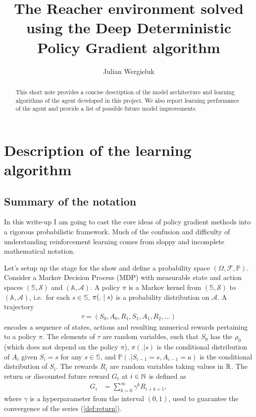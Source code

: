\documentclass[a4paper,12pt]{amsart}
\title[Deep Deterministic Policy Gradients]{The Reacher environment solved using the Deep Deterministic Policy Gradient algorithm}
\author{Julian Wergieluk}\address{}\email{julian.wergieluk@risklab.com}
\newcommand{\stateSpace}{\mathbb S}
\newcommand{\stateSpaceAlg}{\mathcal S}
\newcommand{\actionSpace}{\mathbb A}
\newcommand{\actionSpaceAlg}{\mathcal A}
\newcommand{\policy}{\pi}
\newcommand{\discountFactor}{\gamma}
\newcommand{\prob}{\mathbb P}
\newcommand{\trajectory}{\tau}
\newcommand{\startStateDist}{\rho_0}
\begin{document}
\maketitle

\begin{abstract}
This short note provides a concise description of the model architecture and
learning algorithms of the agent developed in this project. We also report learning
performance of the agent and provide a list of possible future model improvements.
\end{abstract}

\section{Description of the learning algorithm}


\subsection{Summary of the notation}

In this write-up I am going to cast the core ideas of policy gradient methods
into a rigorous probabilistic framework. Much of the confusion and
difficulty of understanding reinforcement learning comes from sloppy and
incomplete mathematical notation.

Let's setup up the stage for the show and define a probability space
$\left( \Omega, \mathcal F, \prob \right)$.
Consider a Markov Decision Process (MDP) with measurable state and action spaces
$(\stateSpace, \stateSpaceAlg)$ and $(\actionSpace, \actionSpaceAlg)$.
A policy $\policy$ is a Markov kernel from $(\stateSpace, \stateSpaceAlg)$ to
$(\actionSpace, \actionSpaceAlg)$, i.e.\ for each $s\in\stateSpace$, 
$\policy(. \vb s)$ is a probability distribution on $\actionSpaceAlg$.
A trajectory
\begin{align*}
    \trajectory = \left( S_0, A_0, R_1, S_1, A_1, R_2, \ldots \right) 
\end{align*}
encodes a sequence of states, actions and resulting
numerical rewards pertaining to a policy $\policy$. The elements of $\tau$
are random variables, such that $S_{0}$ has the  
$\startStateDist$ (which does not depend on the policy $\pi$), 
$\policy(. | s)$ is the conditional distribution of $A_i$ given $S_i = s$ for
any $s\in\stateSpace$, and $\prob\left(. | S_{i-1}= s, A_{i-1}=a \right)$ is
the conditional distribution of $S_{i}$. The rewards $R_i$ are random
variables taking values in $\mathbb{R}$. The return or discounted future reward $G_t$
at $i\in\mathbb{N}$ is defined as
\begin{align}
    G_i &= \sum_{k=0}^{\infty} \discountFactor^{k} R_{i+k+1},
    \label{def:return}
\end{align}
where $\discountFactor$ is a hyperparameter from the interval $(0,1)$, used to guarantee
the convergence of the series (\ref{def:return}).
\end{document}
